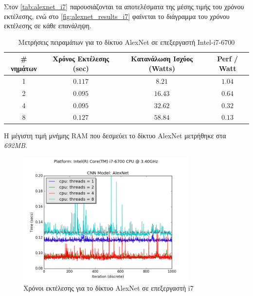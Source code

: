 Στον \autoref{tab:alexnet_i7} παρουσιάζονται τα αποτελέσματα της μέσης τιμής
του χρόνου εκτέλεσης, ενώ στο \autoref{fig:alexnet_results_i7} φαίνεται
το διάγραμμα του χρόνου εκτέλεσης σε κάθε επανάληψη.

\begin{table}[H]
  \begin{center}
    \caption{Μετρήσεις πειραμάτων για το δίκτυο AlexNet σε επεξεργαστή Intel-i7-6700}
    \label{tab:alexnet_i7}
    \begin{tabular}{ | c | c | c | c | }
      \hline
      \rowcolor{Gray}
      \# νημάτων & Χρόνος Εκτέλεσης (sec) & Κατανάλωση Ισχύος (Watts) & Perf / Watt \\
      \hline
      1 & $0.117$ & $8.21$ & $1.04$ \\
      2 & $0.095$ & $16.43$ & $0.64$ \\
      4 & $0.095$ & $32.62$ & $0.32$ \\
      8 & $0.127$ & $58.84$ & $0.13$ \\
      \hline
    \end{tabular}
  \end{center}
\end{table}

Η μέγιστη τιμή μνήμης RAM που δεσμεύει το δίκτυο AlexNet μετρήθηκε στα \emph{692MB}.
\newpage

\begin{figure}[H]
  \centering
  \includegraphics[width=0.8\textwidth]{./images/chapter6/benchmark_alexnet_i7.png}
  \caption[Χρόνoι εκτέλεσης για το δίκτυο AlexNet σε επεξεργαστή i7]{Χρόνοι εκτέλεσης για το δίκτυο AlexNet σε επεξεργαστή i7}
  \label{fig:alexnet_results_i7}
\end{figure}



